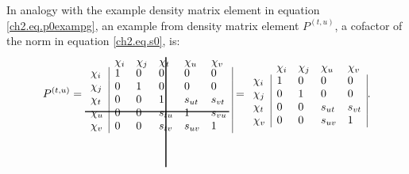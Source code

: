 In analogy with the example density matrix element in equation \ref{ch2.eq.p0exampg}, an example from density matrix element $P^{(t,u)}$, a cofactor of the norm in equation \ref{ch2.eq.s0}, is:
\begin{equation}
P^{(t,u)}=
\begin{array}{llllll}
 & \hskip 46.0 pt \hbox{\lower 93pt\hbox{\vrule height100pt width 1.0pt}}\hskip-47.0pt \chi_i & \chi_j & \chi_t & \chi_u & \chi_v \\
 \noalign{\vskip-91pt}
 \chi_i &  \multicolumn{1}{|l}{ 1 } & 0 & 0 & 0 & \multicolumn{1}{l|}{ 0 } \\
 \chi_j & \multicolumn{1}{|l}{ 0 } & 1 & 0 & 0 & \multicolumn{1}{l|}{ 0 } \\
 \chi_t & \multicolumn{1}{|l}{ 0 } & 0 & 1 & s_{ut} & \multicolumn{1}{l|}{s_{vt}} \\
 \chi_u & \multicolumn{1}{|l}{ 0 } & 0 & s_{tu} & 1 & \multicolumn{1}{l|}{s_{vu}} \\
 \noalign{\vskip-8pt}
 \multispan6\hbox{\vrule  height 1.0 pt width130pt}\cr
 \noalign{\vskip 7pt}
 \chi_v & \multicolumn{1}{|l}{ 0 } & 0 & s_{tv} & s_{uv} & \multicolumn{1}{l|}{ 1 }
\end{array} =
\begin{array}{lllll}
 &  \chi_i & \chi_j & \chi_u & \chi_v \\
 \chi_i & \multicolumn{1}{|l}{ 1 } & 0 & 0 & \multicolumn{1}{l|}{ 0 } \\
 \chi_j & \multicolumn{1}{|l}{ 0 } & 1 & 0 & \multicolumn{1}{l|}{ 0 } \\
 \chi_t & \multicolumn{1}{|l}{ 0 } & 0 & s_{ut} & \multicolumn{1}{l|}{s_{vt}} \\
 \chi_v & \multicolumn{1}{|l}{ 0 } & 0 & s_{uv} & \multicolumn{1}{l|}{1}
\end{array}.
\label{ch2.eq.p0examp}
\end{equation}

